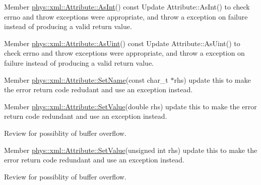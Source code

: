 \label{todo__todo000042}
\hypertarget{todo__todo000042}{}
 
\begin{DoxyDescription}
\item[Member \hyperlink{classphys_1_1xml_1_1Attribute_ada1f2e45ce636ad8482972263364e7fa}{phys::xml::Attribute::AsInt}() const  ]Update Attribute::AsInt() to check errno and throw exceptions were appropriate, and throw a exception on failure instead of producing a valid return value. 
\end{DoxyDescription}

\label{todo__todo000043}
\hypertarget{todo__todo000043}{}
 
\begin{DoxyDescription}
\item[Member \hyperlink{classphys_1_1xml_1_1Attribute_ad00ec5857fc4afcda892a0057419a9a0}{phys::xml::Attribute::AsUint}() const  ]Update Attribute::AsUint() to check errno and throw exceptions were appropriate, and throw a exception on failure instead of producing a valid return value. 
\end{DoxyDescription}

\label{todo__todo000046}
\hypertarget{todo__todo000046}{}
 
\begin{DoxyDescription}
\item[Member \hyperlink{classphys_1_1xml_1_1Attribute_af669654308122897f98858563375bf4c}{phys::xml::Attribute::SetName}(const char\_\-t $\ast$rhs) ]update this to make the error return code redudant and use an exception instead. 
\end{DoxyDescription}

\label{todo__todo000036}
\hypertarget{todo__todo000036}{}
 
\begin{DoxyDescription}
\item[Member \hyperlink{classphys_1_1xml_1_1Attribute_a919034671f61ee408d616409a49dafca}{phys::xml::Attribute::SetValue}(double rhs) ]update this to make the error return code redundant and use an exception instead. 

Review for possiblity of buffer overflow. 
\end{DoxyDescription}

\label{todo__todo000035}
\hypertarget{todo__todo000035}{}
 
\begin{DoxyDescription}
\item[Member \hyperlink{classphys_1_1xml_1_1Attribute_a289ac36b218f3912224fd904ccade1ed}{phys::xml::Attribute::SetValue}(unsigned int rhs) ]update this to make the error return code redundant and use an exception instead. 

Review for possiblity of buffer overflow. 
\end{DoxyDescription}

